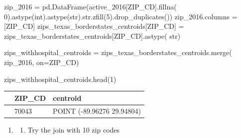 \documentclass[
  letterpaper,
  DIV=11,
  numbers=noendperiod]{scrartcl}
\newenvironment{Shaded}{\begin{snugshade}}{\end{snugshade}}
\newcommand{\BuiltInTok}[1]{\textcolor[rgb]{0.00,0.23,0.31}{#1}}
\newcommand{\DecValTok}[1]{\textcolor[rgb]{0.68,0.00,0.00}{#1}}
\newcommand{\NormalTok}[1]{\textcolor[rgb]{0.00,0.23,0.31}{#1}}
\newcommand{\OperatorTok}[1]{\textcolor[rgb]{0.37,0.37,0.37}{#1}}
\newcommand{\StringTok}[1]{\textcolor[rgb]{0.13,0.47,0.30}{#1}}
\providecommand{\tightlist}{%
  \setlength{\itemsep}{0pt}\setlength{\parskip}{0pt}}\usepackage{longtable,booktabs,array}
\begin{document}
\begin{Shaded}
\begin{Highlighting}[]
\NormalTok{zip\_2016 }\OperatorTok{=}\NormalTok{ pd.DataFrame(active\_2016[}\StringTok{\textquotesingle{}ZIP\_CD\textquotesingle{}}\NormalTok{].fillna(}
    \DecValTok{0}\NormalTok{).astype(}\BuiltInTok{int}\NormalTok{).astype(}\BuiltInTok{str}\NormalTok{).}\BuiltInTok{str}\NormalTok{.zfill(}\DecValTok{5}\NormalTok{).drop\_duplicates())}
\NormalTok{zip\_2016.columns }\OperatorTok{=}\NormalTok{ [}\StringTok{\textquotesingle{}ZIP\_CD\textquotesingle{}}\NormalTok{]}
\NormalTok{zips\_texas\_borderstates\_centroids[}\StringTok{\textquotesingle{}ZIP\_CD\textquotesingle{}}\NormalTok{] }\OperatorTok{=}\NormalTok{ zips\_texas\_borderstates\_centroids[}\StringTok{\textquotesingle{}ZIP\_CD\textquotesingle{}}\NormalTok{].astype(}
    \BuiltInTok{str}\NormalTok{)}

\NormalTok{zips\_withhospital\_centroids }\OperatorTok{=}\NormalTok{ zips\_texas\_borderstates\_centroids.merge(}
\NormalTok{    zip\_2016, on}\OperatorTok{=}\StringTok{\textquotesingle{}ZIP\_CD\textquotesingle{}}\NormalTok{)}
\end{Highlighting}
\end{Shaded}

\begin{Shaded}
\begin{Highlighting}[]
\NormalTok{zips\_withhospital\_centroids.head(}\DecValTok{1}\NormalTok{)}
\end{Highlighting}
\end{Shaded}

\begin{longtable}[]{@{}lll@{}}
\toprule\noalign{}
& ZIP\_CD & centroid \\
\midrule\noalign{}
\endhead
\bottomrule\noalign{}
\endlastfoot
0 & 70043 & POINT (-89.96276 29.94804) \\
\end{longtable}

\begin{enumerate}
\def\labelenumi{\arabic{enumi}.}
\setcounter{enumi}{3}
\tightlist
\item
  \begin{enumerate}
  \def\labelenumii{\alph{enumii}.}
  \tightlist
  \item
    Try the join with 10 zip codes
  \end{enumerate}
\end{enumerate}
\end{document}
